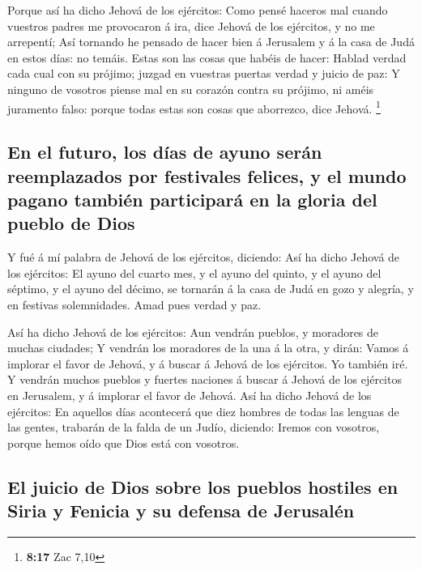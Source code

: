  Porque así ha dicho Jehová de los ejércitos: Como pensé
haceros mal cuando vuestros padres me provocaron á ira, dice Jehová de
los ejércitos, y no me arrepentí;  Así tornando he pensado
de hacer bien á Jerusalem y á la casa de Judá en estos días: no temáis.
 Estas son las cosas que habéis de hacer: Hablad verdad
cada cual con su prójimo; juzgad en vuestras puertas verdad y juicio de
paz:  Y ninguno de vosotros piense mal en su corazón contra
su prójimo, ni améis juramento falso: porque todas estas son cosas que
aborrezco, dice Jehová. \footnote{\textbf{8:17} Zac 7,10}

\hypertarget{en-el-futuro-los-duxedas-de-ayuno-seruxe1n-reemplazados-por-festivales-felices-y-el-mundo-pagano-tambiuxe9n-participaruxe1-en-la-gloria-del-pueblo-de-dios}{%
\subsection{En el futuro, los días de ayuno serán reemplazados por
festivales felices, y el mundo pagano también participará en la gloria
del pueblo de
Dios}\label{en-el-futuro-los-duxedas-de-ayuno-seruxe1n-reemplazados-por-festivales-felices-y-el-mundo-pagano-tambiuxe9n-participaruxe1-en-la-gloria-del-pueblo-de-dios}}

 Y fué á mí palabra de Jehová de los ejércitos, diciendo:
 Así ha dicho Jehová de los ejércitos: El ayuno del cuarto
mes, y el ayuno del quinto, y el ayuno del séptimo, y el ayuno del
décimo, se tornarán á la casa de Judá en gozo y alegría, y en festivas
solemnidades. Amad pues verdad y paz.

 Así ha dicho Jehová de los ejércitos: Aun vendrán pueblos,
y moradores de muchas ciudades;  Y vendrán los moradores de
la una á la otra, y dirán: Vamos á implorar el favor de Jehová, y á
buscar á Jehová de los ejércitos. Yo también iré.  Y
vendrán muchos pueblos y fuertes naciones á buscar á Jehová de los
ejércitos en Jerusalem, y á implorar el favor de Jehová. 
Así ha dicho Jehová de los ejércitos: En aquellos días acontecerá que
diez hombres de todas las lenguas de las gentes, trabarán de la falda de
un Judío, diciendo: Iremos con vosotros, porque hemos oído que Dios está
con vosotros.

\hypertarget{el-juicio-de-dios-sobre-los-pueblos-hostiles-en-siria-y-fenicia-y-su-defensa-de-jerusaluxe9n}{%
\subsection{El juicio de Dios sobre los pueblos hostiles en Siria y
Fenicia y su defensa de
Jerusalén}\label{el-juicio-de-dios-sobre-los-pueblos-hostiles-en-siria-y-fenicia-y-su-defensa-de-jerusaluxe9n}}

